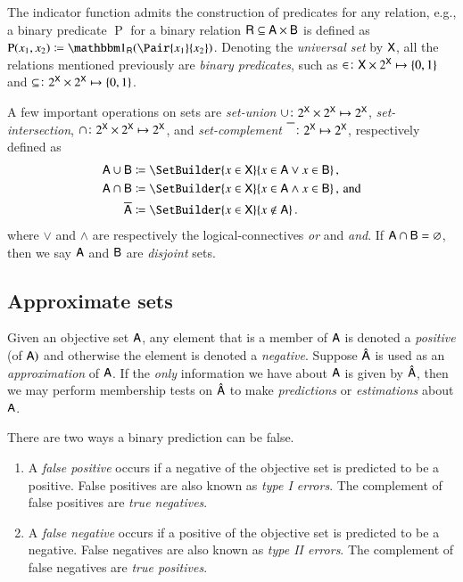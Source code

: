 \documentclass[10pt,final,hidelinks]{article}
\numberwithin{equation}{section}
\newcommand{\SetIndicator}[1]{\BlackboardSet{1}_{#1}}
\newcommand{\EmptySet}{\varnothing}
\newcommand{\PS}[1]{2^{#1}}
\theoremstyle{plain}
\begin{document}
The indicator function admits the construction of predicates for any relation, e.g., a binary predicate $\operatorname{P}$ for a binary relation $\Set{R} \subseteq \Set{A} \times \Set{B}$ is defined as $\operatorname{P}(x_1,x_2) \coloneqq \SetIndicator{\Set{R}}(\Pair{x_1}{x_2})$.
Denoting the \emph{universal set} by $\Set{X}$, all the relations mentioned previously are \emph{binary predicates}, such as $\SetContains \colon \Set{X} \times \PS{\Set{X}} \mapsto \{0,1\}$ and $\subseteq \colon \PS{\Set{X}} \times \PS{\Set{X}} \mapsto \{0,1\}$.

A few important operations on sets are \emph{set-union} $\SetUnion \colon \PS{\Set{X}} \times \PS{\Set{X}} \mapsto \PS{\Set{X}}$, \emph{set-intersection}, $\SetIntersection \colon \PS{\Set{X}} \times \PS{\Set{X}} \mapsto \PS{\Set{X}}$, and \emph{set-complement} $\SetComplement \colon \PS{\Set{X}} \mapsto \PS{\Set{X}}$, respectively defined as
\begin{align}
	\SetUnion[\Set{A}][\Set{B}]			&\coloneqq \SetBuilder{ x \in \Set{X}}{x \in \Set{A} \lor x \in \Set{B}}\,,\\
	\SetIntersection[\Set{A}][\Set{B}]	&\coloneqq \SetBuilder{ x \in \Set{X}}{x \in \Set{A} \land x \in \Set{B}}\,,\,\text{and}\\
	\SetComplement[\Set{A}]				&\coloneqq \SetBuilder{ x \in \Set{X}}{x \notin \Set{A}}\,.
\end{align}
where $\lor$ and $\land$ are respectively the logical-connectives \emph{or} and \emph{and}.
If $\SetIntersection[\Set{A}][\Set{B}] = \EmptySet$, then we say $\Set{A}$ and $\Set{B}$ are \emph{disjoint} sets.

\subsection{Approximate sets}
\label{sec:asets}
Given an objective set $\Set{A}$, any element that is a member of $\Set{A}$ is denoted a \emph{positive} (of $\Set{A})$ and otherwise the element is denoted a \emph{negative}.
Suppose $\hat{\Set{A}}$ is used as an \emph{approximation} of $\Set{A}$.
If the \emph{only} information we have about $\Set{A}$ is given by $\hat{\Set{A}}$, then we may perform membership tests on $\hat{\Set{A}}$ to make \emph{predictions} or \emph{estimations} about $\Set{A}$.

There are two ways a binary prediction can be false.
\begin{enumerate}
	\item A \emph{false positive} occurs if a negative of the objective set is predicted to be a positive. False positives are also known as \emph{type I errors}.
	The complement of false positives are \emph{true negatives}.
	\item A \emph{false negative} occurs if a positive of the objective set is predicted to be a negative. False negatives are also known as \emph{type II errors}.
	The complement of false negatives are \emph{true positives}.
\end{enumerate} 
\end{document}
